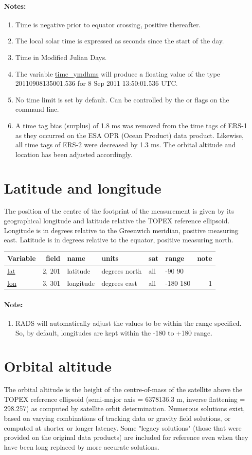 \documentclass[a4paper,11pt,openany,natbib,nomargin]{thesis}
\makeatletter
\newcommand\var[1]{\url{#1}\index{variables!#1@\protect\url{#1}}}
\newenvironment{vartable}{
\begin{table}[ht]
\small
\begin{tabular}{lrllllr}
\hline
Variable & field & name & units & sat & range & note \\
\hline
}{
\hline
\end{tabular}
\end{table}
}
\newenvironment{notes}[1][Notes:]{\FloatBarrier\paragraph{#1}\begin{enumerate}}{\end{enumerate}}
\makeatother
\begin{document}
\begin{notes}
\item Time is negative prior to equator crossing, positive thereafter.\label{item:time_rel_eq}
\item The local solar time is expressed as seconds since the start of the day.\label{item:time_local_solar}
\item Time in Modified Julian Days.\label{item:time_mjd}
\item The variable \var{time_ymdhms} will produce a floating value of the type 20110908135001.536 for 8 Sep 2011 13:50:01.536 UTC.\label{item:time_ymdhms}
\item No time limit is set by default. Can be controlled by the  or  flags on the command line.\label{item:time}
\item A time tag bias (surplus) of 1.8 ms was removed from the time tags of ERS-1 as they occurred on the ESA OPR (Ocean Product) data product. Likewise, all time tags of ERS-2 were decreased by 1.3 ms. The orbital altitude and location has been adjusted accordingly.
\end{notes}

\section{Latitude and longitude}
The position of the centre of the footprint of the measurement is given by its geographical longitude and latitude relative the TOPEX reference ellipsoid. Longitude is in degrees relative to the Greenwich meridian, positive measuring east. Latitude is in degrees relative to the equator, positive measuring north.

\begin{vartable}
\var{lat} & 2, 201 & latitude & degrees north & all & -90 90 & \\
\var{lon} & 3, 301 & longitude & degrees east & all & -180 180 & 1 \\
\end{vartable}

\begin{notes}[Note:]
\item RADS will automatically adjust the values to be within the range specified. So, by default, longitudes are kept within the -180 to +180 range.
\end{notes}

\section{Orbital altitude}\label{var:alt}
The orbital altitude is the height of the centre-of-mass of the satellite above the TOPEX reference ellipsoid (semi-major axis = 6378136.3 m, inverse flattening = 298.257) as computed by satellite orbit determination. Numerous solutions exist, based on varying combinations of tracking data or gravity field solutions, or computed at shorter or longer latency. Some "legacy solutions" (those that were provided on the original data products) are included for reference even when they have been long replaced by more accurate solutions.
\end{document}
